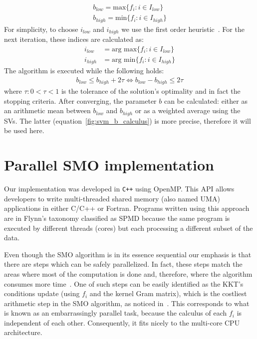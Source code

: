 \documentclass{llncs}
\begin{document}
\begin{align}
b_{low}=\text{max}\{f_i:i\in I_{low}\} \\
b_{high}=\text{min}\{f_i:i\in I_{high}\}
\end{align}
For simplicity, to choose $i_{low}$ and $i_{high}$ we use the first order heuristic~\cite{Keerthi2001}. For the next iteration, these indices are calculated as:
\begin{align}
i_{low}&=\text{arg max}\{f_i:i\in I_{low}\} \\
i_{high}&=\text{arg min}\{f_i:i\in I_{high}\}
\end{align}
The algorithm is executed while the following holds:
\begin{align}
b_{low}\leq b_{high} + 2\tau \Leftrightarrow b_{low} - b_{high} \leq 2\tau
\end{align}
where $\tau : 0<\tau<1$ is the tolerance of the solution's optimality and in fact the stopping criteria. After converging, the parameter $b$ can be calculated: either as an arithmetic mean between $b_{low}$ and $b_{high}$ or as a weighted average using the SVs. The latter  (equation~\ref{fig:svm_b_calculus}) is more precise, therefore it will be used here. %
\section{Parallel SMO implementation}
\label{sec:svm_psmo}
Our implementation was developed in \texttt{C++} using OpenMP. This \acs{API} allows developers to write multi-threaded shared memory (also named \ac{UMA}) applications in either C/C++ or Fortran. Programs written using this approach are in Flynn's taxonomy classified as \ac{SPMD} because the same program is executed by different threads (cores) but each processing a different subset of the data.

Even though the SMO algorithm is in its essence sequential our emphasis is that there are steps which can be safely parallelized. In fact, these steps match the areas where most of the computation is done and, therefore, where the algorithm  consumes more time~\cite{L.J.Cao2006,Catanzaro2008}. One of such steps can be easily identified as the \ac{KKT}'s conditions update (using $f_i$ and the kernel Gram matrix), which is the costliest arithmetic step in the \ac{SMO} algorithm, as noticed in~\cite{L.J.Cao2006}. This corresponds to what is known as an embarrassingly parallel task, because the calculus of each $f_i$ is independent of each other. Consequently, it fits nicely to the multi-core \ac{CPU} architecture.
\end{document}

